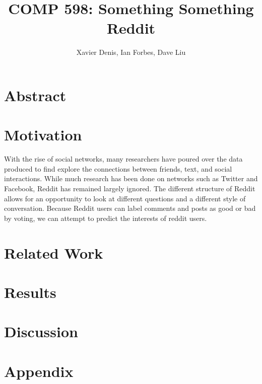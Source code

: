 \documentclass[11pt,twocolumn]{article}
\title {COMP 598: Something Something Reddit}
\author {Xavier Denis, Ian Forbes, Dave Liu}
\begin{document}
\maketitle

\section {Abstract}

\section {Motivation}
With the rise of social networks, many researchers have poured over the data produced to find explore the connections between friends, text, and social interactions. While much research has been done on networks such as Twitter and Facebook, Reddit has remained largely ignored. The different structure of Reddit allows for an opportunity to look at different questions and a different style of conversation. Because Reddit users can label comments and posts as good or bad by voting, we can attempt to predict the interests of reddit users. 
\section {Related Work}

\section {Results}

\section {Discussion}

\section {Appendix}
\end{document}
